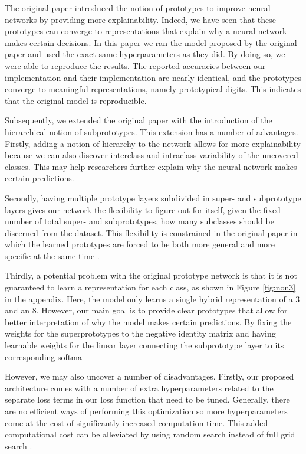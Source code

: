 The original paper \cite{li2018deep} introduced the notion of prototypes to improve neural networks by providing more explainability. Indeed, we have seen that these prototypes can converge to representations that explain why a neural network makes certain decisions. In this paper we ran the model proposed by the original paper and used the exact same hyperparameters as they did. By doing so, we were able to reproduce the results. The reported accuracies between our implementation and their implementation are nearly identical, and the prototypes converge to meaningful representations, namely prototypical digits. This indicates that the original model is reproducible. 

Subsequently, we extended the original paper with the introduction of the hierarchical notion of subprototypes. This extension has a number of advantages. Firstly, adding a notion of hierarchy to the network allows for more explainability because we can also discover interclass and intraclass variability of the uncovered classes. This may help researchers further explain why the neural network makes certain predictions.

Secondly, having multiple prototype layers subdivided in super- and subprototype layers gives our network the flexibility to figure out for itself, given the fixed number of total super- and subprototypes, how many subclasses should be discerned from the dataset. This flexibility is constrained in the original paper in which the learned prototypes are forced to be both more general and more specific at the same time \cite{li2018deep}. 

Thirdly, a potential problem with the original prototype network is that it is not guaranteed to learn a representation for each class, as shown in Figure \ref{fig:non3} in the appendix. Here, the model only learns a single hybrid representation of a 3 and an 8. However, our main goal is to provide clear prototypes that allow for better interpretation of why the model makes certain predictions. By fixing the weights for the superprototypes to the negative identity matrix and having learnable weights for the linear layer connecting the subprototype layer to its corresponding softma

However, we may also uncover a number of disadvantages. Firstly, our proposed architecture comes with a number of extra hyperparameters related to the separate loss terms in our loss function that need to be tuned. Generally, there are no efficient ways of performing this optimization \cite{paramoptimization} so more hyperparameters come at the cost of significantly increased computation time. This added computational cost can be alleviated by using random search instead of full grid search \cite{paramoptimization}.

